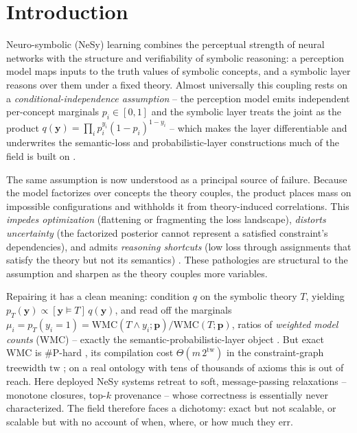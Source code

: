 \documentclass[anon]{nesy2026}
\newcommand{\WMC}{\ensuremath{\mathrm{WMC}}}
\newcommand{\tw}{\ensuremath{\mathrm{tw}}}
\newcommand{\bC}[1]{\boldsymbol{#1}}
\begin{document}
\section{Introduction}
Neuro-symbolic (NeSy) learning combines the perceptual strength of neural networks with
the structure and verifiability of symbolic reasoning: a perception model maps inputs to
the truth values of symbolic concepts, and a symbolic layer reasons over them under a fixed
theory. Almost universally this coupling rests on a \emph{conditional-independence
assumption} -- the perception model emits independent per-concept marginals $p_i\in[0,1]$
and the symbolic layer treats the joint as the product
$q(\bC y)=\prod_i p_i^{y_i}(1-p_i)^{1-y_i}$
\citep{manhaeve2018deepproblog,xu2018semanticloss,ahmed2022spl} -- which makes the layer
differentiable and underwrites the semantic-loss and probabilistic-layer constructions much
of the field is built on \citep{xu2018semanticloss,ahmed2022spl,deraedt2020survey}.

The same assumption is now understood as a principal source of failure. Because the model
factorizes over concepts the theory couples, the product places mass on impossible
configurations and withholds it from theory-induced correlations. This \emph{impedes
optimization} (flattening or fragmenting the loss landscape), \emph{distorts uncertainty}
(the factorized posterior cannot represent a satisfied constraint's dependencies), and
admits \emph{reasoning shortcuts} (low loss through assignments that satisfy the theory but
not its semantics) \citep{vankrieken2024independence,marconato2023reasoningshortcuts,marconato2024bears}.
These pathologies are structural to the assumption and sharpen as the theory couples more
variables.

Repairing it has a clean meaning: condition $q$ on the symbolic theory $T$, yielding
$p_T(\bC y)\propto[\bC y\models T]\,q(\bC y)$, and read off the marginals
$\mu_i=p_T(y_i{=}1)=\WMC(T\wedge y_i;\bC p)/\WMC(T;\bC p)$, ratios of \emph{weighted model
counts} (WMC) -- exactly the semantic-probabilistic-layer object
\citep{ahmed2022spl,xu2018semanticloss}. But exact WMC is $\#$P-hard \citep{chavira2008wmc},
its compilation cost $\Theta(m\,2^{\tw})$ in the constraint-graph treewidth $\tw$
\citep{darwiche2002kcmap,darwiche2011sdd,bodlaender1993treewidth}; on a real ontology with
tens of thousands of axioms this is out of reach. Here deployed NeSy systems retreat to
soft, message-passing relaxations -- monotone closures, top-$k$ provenance -- whose
correctness is essentially never characterized. The field therefore faces a dichotomy: exact but
not scalable, or scalable but with no account of when, where, or how much they err.
\end{document}
